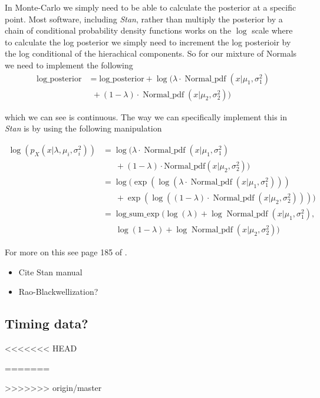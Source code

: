 \documentclass{article}
\begin{document}
In Monte-Carlo we simply need to be able to calculate the posterior at a specific point. Most software, including \emph{Stan}, rather than multiply the posterior by a chain of conditional probability density functions works on the $\log$ scale where to calculate the log posterior we simply need to increment the log posterioir by the log conditional of the hierachical components. So for our mixture of Normals we need to implement the following
\begin{align}
  \text{log\_posterior} &= \text{log\_posterior} + \log(\lambda \cdot \operatorname{Normal\_pdf}(x | \mu_1, \sigma_1^2)  \nonumber \\
                   & \ \ + (1 - \lambda) \cdot \operatorname{Normal\_pdf}(x | \mu_2, \sigma_2^2))
\end{align}

which we can see is continuous. The way we can specifically implement this in \emph{Stan} is by using the following manipulation

\begin{align}
\log(p_X(x | \lambda, \mu_i, \sigma^2_i)) &= \log(\lambda \cdot \operatorname{Normal\_pdf}(x | \mu_1, \sigma_1^2)  \nonumber \\
& \ \ \ \ \ \ \ + (1 - \lambda) \cdot \text{Normal\_pdf}(x | \mu_2, \sigma_2^2)) \\
&= \log(\exp(\log(\lambda \cdot \operatorname{Normal\_pdf}(x | \mu_1, \sigma_1^2)))  \nonumber \\
& \ \ \ \ \ \ \ + \exp(\log((1 - \lambda) \cdot \operatorname{Normal\_pdf}(x | \mu_2, \sigma_2^2)))) \\
&= \operatorname{log\_sum\_exp}(\log(\lambda) + \log\operatorname{Normal\_pdf}(x | \mu_1, \sigma_1^2),  \nonumber \\
& \ \ \ \ \ \ \ \log(1 - \lambda) + \log\operatorname{Normal\_pdf}(x | \mu_2, \sigma_2^2))
\end{align} 

For more on this see page 185 of \cite{stan}.

\begin{itemize}

\item Cite Stan manual

\item Rao-Blackwellization? 

\end{itemize}

\subsection{Timing data?}

<<<<<<< HEAD

{}
=======
{}

>>>>>>> origin/master
\end{document}
